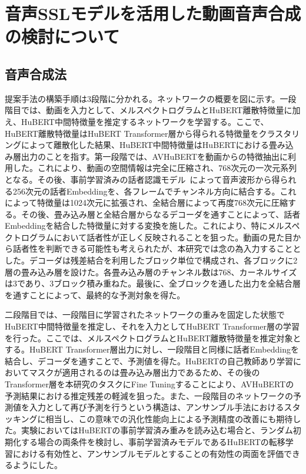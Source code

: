 \documentclass[12pt]{jarticle}
\numberwithin{equation}{section}    %
\numberwithin{figure}{section}      %
\numberwithin{table}{section}      %
\begin{document}
\section{音声SSLモデルを活用した動画音声合成の検討について}
\subsection{音声合成法}
提案手法の構築手順は3段階に分かれる。ネットワークの概要を図に示す。一段階目では、動画を入力として、メルスペクトログラムとHuBERT離散特徴量に加え、HuBERT中間特徴量を推定するネットワークを学習する。ここで、HuBERT離散特徴量はHuBERT Transformer層から得られる特徴量をクラスタリングによって離散化した結果、HuBERT中間特徴量はHuBERTにおける畳み込み層出力のことを指す。第一段階では、AVHuBERTを動画からの特徴抽出に利用した。これにより、動画の空間情報は完全に圧縮され、768次元の一次元系列となる。その後、事前学習済みの話者認識モデル~\cite{wan2018generalized}によって音声波形から得られる256次元の話者Embeddingを、各フレームでチャンネル方向に結合する。これによって特徴量は1024次元に拡張され、全結合層によって再度768次元に圧縮する。その後、畳み込み層と全結合層からなるデコーダを通すことによって、話者Embeddingを結合した特徴量に対する変換を施した。これにより、特にメルスペクトログラムにおいて話者性が正しく反映されることを狙った。動画の見た目から話者性を判断できる可能性も考えられたが、本研究では念の為入力することとした。デコーダは残差結合を利用したブロック単位で構成され、各ブロックに2層の畳み込み層を設けた。各畳み込み層のチャンネル数は768、カーネルサイズは3であり、3ブロック積み重ねた。最後に、全ブロックを通した出力を全結合層を通すことによって、最終的な予測対象を得た。

二段階目では、一段階目に学習されたネットワークの重みを固定した状態でHuBERT中間特徴量を推定し、それを入力としてHuBERT Transformer層の学習を行った。ここでは、メルスペクトログラムとHuBERT離散特徴量を推定対象とする。HuBERT Transformer層出力に対し、一段階目と同様に話者Embeddingを結合し、デコーダを通すことで、予測値を得た。HuBERTの自己教師あり学習においてマスクが適用されるのは畳み込み層出力であるため、その後のTransformer層を本研究のタスクにFine Tuningすることにより、AVHuBERTの予測結果における推定残差の軽減を狙った。また、一段階目のネットワークの予測値を入力として再び予測を行うという構造は、アンサンブル手法におけるスタッキングに相当し、この意味での汎化性能向上による予測精度の改善にも期待した。実験においてはHuBERTの事前学習済み重みを読み込む場合と、ランダム初期化する場合の両条件を検討し、事前学習済みモデルであるHuBERTの転移学習における有効性と、アンサンブルモデルとすることの有効性の両面を評価できるようにした。
\end{document}
